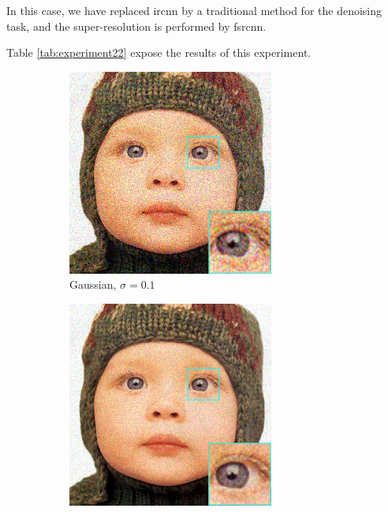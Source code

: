 In this case, we have replaced \gls{ircnn} by a traditional method for the denoising task, and the super-resolution is performed by \gls{fsrcnn}.

Table \ref{tab:experiment22} expose the results of this experiment. 

\begin{figure}
	\centering
	\begin{subfigure}{0.24\textwidth}
		\includegraphics[width=\textwidth]{images/exp2.2/gaussian0.png}
		\caption{Gaussian, $\sigma=0.1$}
	\end{subfigure}
	\begin{subfigure}{0.24\textwidth}
		\includegraphics[width=\textwidth]{images/exp2.2/poisson0.png}

\end{subfigure}
\end{figure}
